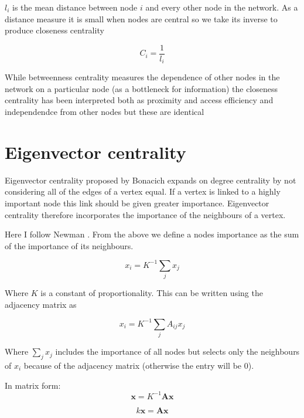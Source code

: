 $l_i$ is the mean distance between node $i$ and every other node in the network. As a distance measure it is small when nodes are central so we take its inverse to produce closeness centrality


\begin{equation}
    C_i = \frac{1}{l_i}
\end{equation}

While betweenness centrality measures the dependence of other nodes in the network on a particular node (as a bottleneck for information) the closeness centrality has been interpreted both as proximity and access efficiency and independendce from other nodes  but these are identical



\section{Eigenvector centrality}

Eigenvector centrality proposed by Bonacich \cite{bonacich1972factoring} expands on degree centrality by not considering all of the edges of a vertex equal. If a vertex is linked to a highly important node this link should be given greater importance. Eigenvector centrality therefore incorporates the importance of the neighbours of a vertex.

Here I follow Newman \cite{newman2018networks}. From the above we define a nodes importance as the sum of the importance of its neighbours.

\begin{equation}
    x_i = K^{-1} \sum_j x_j
\end{equation}

Where $K$ is a constant of proportionality. This can be written using the adjacency matrix as

\begin{equation}
    x_i = K^{-1} \sum_j A_{ij} x_j
\end{equation}

Where $\sum_j x_j$ includes the importance of all nodes but selects only the neighbours of $x_i$ because of the adjacency matrix (otherwise the entry will be 0).

In matrix form:
\begin{equation}
    \mathbf{x}=K^{-1}\mathbf{Ax}
    \end{equation}
    
    \begin{equation}
         k\mathbf{x}=\mathbf{Ax}
    \end{equation}
  
